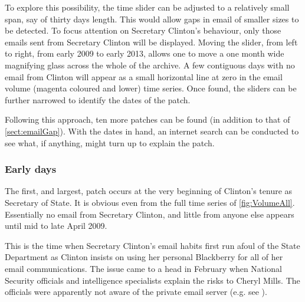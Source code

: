 \documentclass[journal]{vgtc}                %
\begin{document}
To explore this possibility,  the time slider can be adjusted to a relatively small span, say of thirty days length.  This would allow gaps in email of smaller sizes to be detected.  To focus attention on Secretary Clinton's behaviour, only those emails sent from Secretary Clinton will be displayed.  
Moving the slider, from left to right, from early 2009 to early 2013, allows one to move a one month wide magnifying glass across the whole of the archive.  A few contiguous days with no email from Clinton will appear as a small horizontal line at zero in the email volume (magenta coloured and lower) time series.  Once found, the sliders can be further narrowed to identify the dates of the patch.

Following this approach, ten 
more patches can be found (in addition to that of \autoref{sect:emailGap}).  With the dates in hand, an internet search can be conducted to see what, if anything, might turn up to explain the patch.
\subsubsection{Early days}
\label{sect:youHaveNoMail}
The first, and largest, patch occurs at the very beginning of Clinton's tenure as Secretary of State.  It is  obvious even from the full time series of \autoref{fig:VolumeAll}.  Essentially no email from Secretary Clinton, and little from anyone else appears until mid to late April 2009.  

This is the time when Secretary Clinton's email habits first run afoul of the State Department as Clinton insists on using her personal Blackberry for all of her email communications.  The issue came to a head in February when National Security officials and intelligence specialists explain the risks to Cheryl Mills.  The officials were apparently not aware  of the private email server (e.g. see \cite{TakingRootWashPost}).  
\end{document}
